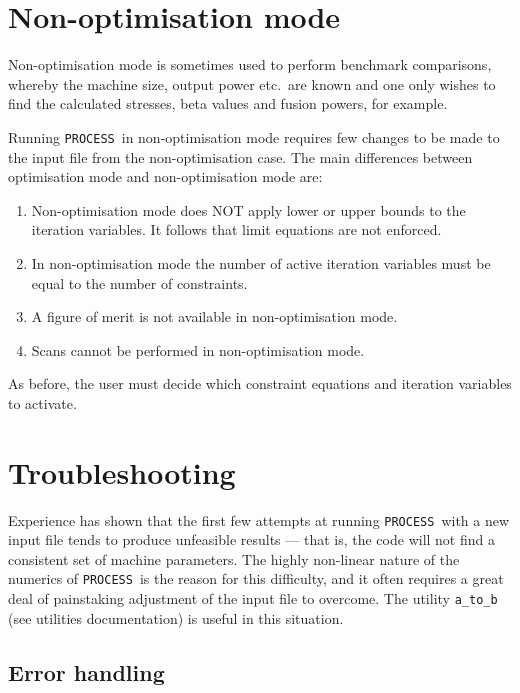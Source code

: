 \documentclass[11pt,a4paper]{report}
\newcommand{\process}{\mbox{\texttt{PROCESS}}}
\begin{document}
\section{Non-optimisation mode}
\label{sec:optim}

Non-optimisation mode is sometimes used to perform benchmark comparisons, whereby the
machine size, output power etc.\ are known and one only wishes to find the
calculated stresses, beta values and fusion powers, for example.

Running \process\ in non-optimisation mode requires few changes to be made to the
input file from the non-optimisation case. The main differences between
optimisation mode and non-optimisation mode are:

\begin{enumerate}

\item Non-optimisation mode does NOT apply lower or upper bounds to the iteration
  variables.  It follows that limit equations are not enforced.

\item In non-optimisation mode the number of active iteration variables must be equal to the number of constraints.

\item A figure of merit is not available in non-optimisation mode.

\item Scans cannot be performed in non-optimisation mode.

\end{enumerate}

As before, the user must decide which constraint equations and iteration
variables to activate.


\section{Troubleshooting}
\label{sec:problems}

Experience has shown that the first few attempts at running \process\ with a
new input file tends to produce unfeasible results --- that is, the code will
not find a consistent set of machine parameters. The highly non-linear nature
of the numerics of \process\ is the reason for this difficulty, and it often
requires a great deal of painstaking adjustment of the input file to overcome.  The utility
\texttt{a\_to\_b} (see utilities documentation) is useful in this situation.

\subsection{Error handling}
\label{sec:errors}
\end{document}
